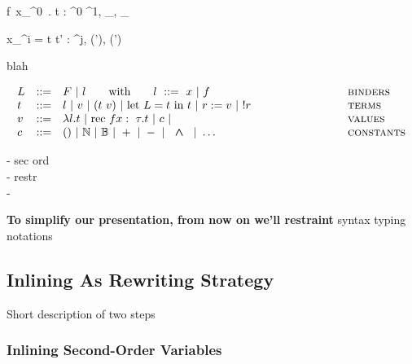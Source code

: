 \documentclass[a4paper,11pt,oneside]{article}
\theoremstyle{plain}
\newcommand{\bwedge}{\boldsymbol{~\wedge~}}
\newcommand{\bvee}{\boldsymbol{~\vee~}}
\begin{document}
\begin{footnotesize}
\begin{multicols}{2}	
	{ f~x_{\tau^0}~. t : \tau^{0} \stackrel{\theta, \top_{\rho}}{\rightarrow} \tau^{1}, \bot_{\theta}, \bot_{\rho}}

\infrule[T$_{ML^{^2}}$-Let]
	{t_1 : \tau^i, \theta, \rho \qquad t' : \tau^j, \theta', \rho'
	\qquad i = 2 \Rightarrow \boldsymbol{(\theta = \bot_{\theta} \bwedge \rho = \bot_{\rho})}}
	{ x_{\tau^i} = t  t'  : \tau^{j}, (\theta \bvee \theta'), (\rho \bvee \rho')} 
\end{multicols}
\end{footnotesize}

blah



\begin{displaymath}
	\begin{array}{lll@{\hspace*{3cm}}l}
	L &::=& F ~|~ l \qquad \text{with}\qquad  l~::=~ x ~|~ f 
	& \textsc{binders} \\	
	t &::=& l ~|~ v~|~(t~v)
	~|~\text{let } L = t \text{ in } t 
	~|~ r := v ~|~ !r
	& \textsc{terms}\\
	v &::=& \lambda l. t ~|~ \text{rec } f x :~\tau . t
	~|~ c ~|~ 
	& \textsc{values} \\
	c &::=& \text{()} ~|~ \mathbb{N}~|~\mathbb{B}~|~+~|~-~|~\bwedge~|	~\dots
	& \textsc{constants} \\
	
	 
	\end{array}
\end{displaymath}

- sec ord \\
- restr \\
- 

\textbf{To simplify our presentation, from now on we'll restraint  
}
syntax typing notations


\subsection{Inlining As Rewriting Strategy}

Short description of two steps
\subsubsection*{Inlining Second-Order Variables}
\end{document}
